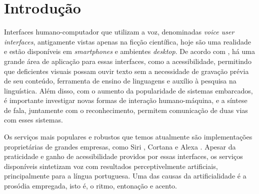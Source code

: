 


\chapter{Introdução}

Interfaces humano-computador que utilizam a voz, denominadas \emph{voice user
  interfaces}, antigamente vistas apenas na ficção científica, hoje são uma
realidade e estão disponíveis em \emph{smartphones} e ambientes \emph{desktop}.
De acordo com \cite{tts-book, martinjurafsky}, há uma grande área de aplicação
para essas interfaces, como a acessibilidade, permitindo que
deficientes visuais possam ouvir texto sem a necessidade de gravação prévia de
seu conteúdo, ferramenta de ensino de linguagens e auxílio à pesquisa na linguística. Além disso, com o aumento da popularidade de sistemas embarcados,
é importante investigar novas formas de interação humano-máquina, e a síntese de
fala, juntamente com o reconhecimento, permitem comunicação de duas vias com
esses sistemas.


Os serviços mais populares e robustos que temos atualmente são implementações proprietárias de grandes empresas, como Siri \cite{siri}, Cortana \cite{cortana} e Alexa \cite{alexa}. Apesar da praticidade e ganho de acessibilidade providos por essas interfaces, os serviços disponíveis sintetizam voz com resultados perceptivelmente artificiais, principalmente para a língua portuguesa. Uma das causas da artificialidade é a prosódia empregada, isto é, o ritmo, entonação e acento.

